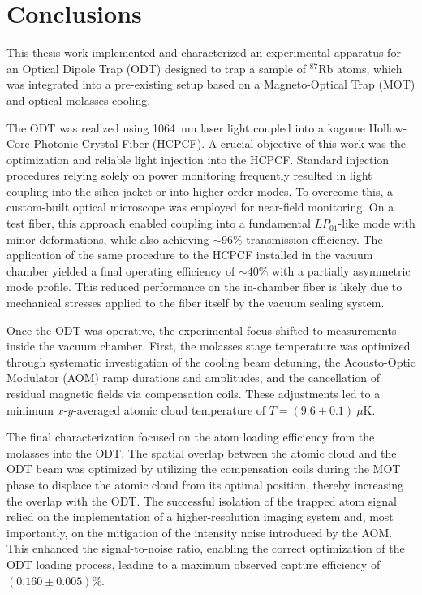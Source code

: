 \documentclass[../../thesis_main.tex]{subfiles}
\begin{document}
    \chapter*{Conclusions}
    
    This thesis work implemented and characterized an experimental apparatus for an Optical Dipole Trap (ODT) designed to trap a sample of $^{87}$Rb atoms, which was integrated into a pre-existing setup based on a Magneto-Optical Trap (MOT) and optical molasses cooling.

    The ODT was realized using 1064~nm laser light coupled into a kagome Hollow-Core Photonic Crystal Fiber (HCPCF). A crucial objective of this work was the optimization and reliable light injection into the HCPCF. Standard injection procedures relying solely on power monitoring frequently resulted in light coupling into the silica jacket or into higher-order modes. To overcome this, a custom-built optical microscope was employed for near-field monitoring. On a test fiber, this approach enabled coupling into a fundamental $LP_{01}$-like mode with minor deformations, while also achieving $\sim96\%$ transmission efficiency. The application of the same procedure to the HCPCF installed in the vacuum chamber yielded a final operating efficiency of $\sim 40\%$ with a partially asymmetric mode profile. This reduced performance on the in-chamber fiber is likely due to mechanical stresses applied to the fiber itself by the vacuum sealing system.

    Once the ODT was operative, the experimental focus shifted to measurements inside the vacuum chamber. First, the molasses stage temperature was optimized through systematic investigation of the cooling beam detuning, the Acousto-Optic Modulator (AOM) ramp durations and amplitudes, and the cancellation of residual magnetic fields via compensation coils. These adjustments led to a minimum $x$-$y$-averaged atomic cloud temperature of $T = (9.6 \pm 0.1)~\mu\text{K}$.

    The final characterization focused on the atom loading efficiency from the molasses into the ODT. The spatial overlap between the atomic cloud and the ODT beam was optimized by utilizing the compensation coils during the MOT phase to displace the atomic cloud from its optimal position, thereby increasing the overlap with the ODT. The successful isolation of the trapped atom signal relied on the implementation of a higher-resolution imaging system and, most importantly, on the mitigation of the intensity noise introduced by the AOM. This enhanced the signal-to-noise ratio, enabling the correct optimization of the ODT loading process, leading to a maximum observed capture efficiency of $(0.160 \pm 0.005)\%$.
\end{document}
